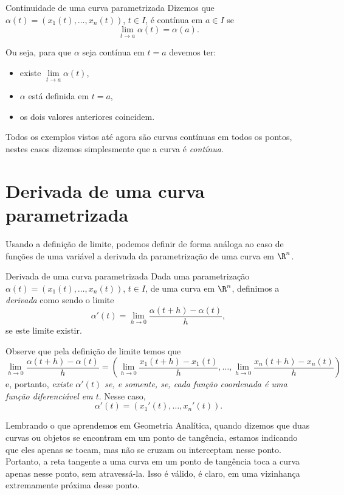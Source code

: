  \begin{definition}{Continuidade de uma curva parametrizada}{}
 Dizemos que $\alpha(t)=(x_1(t),\dots,x_n(t))$, $t\in I$, é contínua em $a\in I$ se 
 $$\lim_{t\rightarrow a} \alpha(t)=\alpha (a).$$
 \end{definition}
 Ou seja, para que $\alpha$ seja contínua em $t=a$ devemos ter:  
 \begin{itemize}[label=\color{chapterscolor}\textbullet]
 \item existe $\lim\limits_{t\rightarrow a} \alpha(t)$,
 \item $\alpha$ está definida em $t=a$, 
 \item os dois valores anteriores coincidem. 
 \end{itemize}

 Todos os exemplos vistos até agora são curvas contínuas em todos os pontos, nestes casos dizemos simplesmente que a curva é \textit{contínua}. 

\section{Derivada de uma curva parametrizada}
Usando a definição de limite, podemos definir de forma análoga ao caso de funções de uma variável a derivada da parametrização de uma curva em $\R^n$. 

 \begin{definition}{Derivada de uma curva parametrizada}{}
 Dada uma parametrização $\alpha(t)=(x_1(t),\dots,x_n(t))$, $t\in I$, de uma curva em $\R^n$, definimos a \textit{derivada} como sendo o limite
 $$\alpha'(t)=\lim_{h\rightarrow 0}\dfrac{\alpha (t+h)-\alpha (t)}{h},$$
se este limite existir.     
 \end{definition}

Observe que pela definição de limite temos que 
 $$\lim_{h\rightarrow 0}\dfrac{\alpha (t+h)-\alpha (t)}{h}=\left(\lim_{h\rightarrow 0}\dfrac{x_1 (t+h)-x_1 (t)}{h},\dots,\lim_{h\rightarrow 0}\dfrac{x_n (t+h)-x_n (t)}{h}\right)$$
e, portanto, \textit{existe $\alpha'(t)$ se, e somente, se, cada função coordenada é uma função diferenciável em $t$}.
Nesse caso, 
$$\alpha'(t)=(x_1'(t),\dots,x_n'(t)).$$


Lembrando o que aprendemos em Geometria Analítica, quando dizemos que duas curvas ou objetos se encontram em um ponto de tangência, estamos indicando que eles apenas se tocam, mas não se cruzam ou interceptam nesse ponto. Portanto, a reta tangente a uma curva em um ponto de tangência toca a curva apenas nesse ponto, sem atravessá-la. Isso é válido, é claro, em uma vizinhança extremamente próxima desse ponto.

